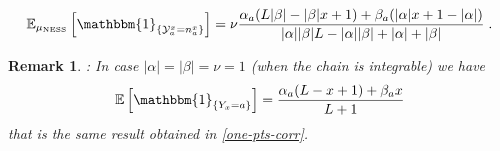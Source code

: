 \documentclass[10pt]{article}
\numberwithin{equation}{section}
\numberwithin{equation}{subsection}
\newtheorem{remark}{Remark}
\newcommand{\dt}{\;.}
\begin{document}
\begin{equation}
	\mathbb{E}_{\mu_{\text{NESS}}}\left[\mathbbm{1}_{\{\mathcal{Y}_{a}^{x}=n_{a}^{x}\}}\right]=\nu\frac{\alpha_{a}(L|\beta|-|\beta|x+1)+\beta_{a}(|\alpha|x+1-|\alpha|)}{|\alpha||\beta|L-|\alpha||\beta|+|\alpha|+|\beta|}\dt
\end{equation}
\begin{remark}: In case $|\alpha|=|\beta|=\nu=1$ (when the chain is integrable) we have 
\begin{equation}
		\mathbb{E}\left[\mathbbm{1}_{\{Y_{x}=a\}}\right]=\frac{\alpha_{a}(L-x+1)+\beta_{a}x}{L+1}
\end{equation}
that is the same result obtained in \eqref{one-pts-corr}.  
\end{remark}
\end{document}
